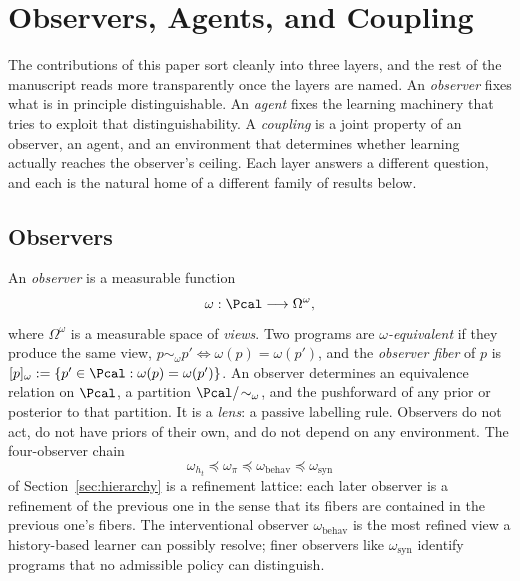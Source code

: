 %

\section{Observers, Agents, and Coupling}
\label{sec:ontology}

The contributions of this paper sort cleanly into three layers, and the rest of the manuscript reads more transparently once the layers are named. An \emph{observer} fixes what is in principle distinguishable. An \emph{agent} fixes the learning machinery that tries to exploit that distinguishability. A \emph{coupling} is a joint property of an observer, an agent, and an environment that determines whether learning actually reaches the observer's ceiling. Each layer answers a different question, and each is the natural home of a different family of results below.

\subsection{Observers}
\label{sec:ontology-observers}

An \emph{observer} is a measurable function
\[
\omega:\Pcal\longrightarrow\Omega^\omega,
\]
where $\Omega^\omega$ is a measurable space of \emph{views}. Two programs are \emph{$\omega$-equivalent} if they produce the same view, $p\sim_\omega p'\iff\omega(p)=\omega(p')$, and the \emph{observer fiber} of $p$ is $[p]_\omega:=\{p'\in\Pcal:\omega(p)=\omega(p')\}$. An observer determines an equivalence relation on $\Pcal$, a partition $\Pcal/\!\sim_\omega$, and the pushforward of any prior or posterior to that partition. It is a \emph{lens}: a passive labelling rule. Observers do not act, do not have priors of their own, and do not depend on any environment. The four-observer chain
\[
\omega_{h_t}\preceq\omega_\pi\preceq\omega_{\mathrm{behav}}\preceq\omega_{\mathrm{syn}}
\]
of Section~\ref{sec:hierarchy} is a refinement lattice: each later observer is a refinement of the previous one in the sense that its fibers are contained in the previous one's fibers. The interventional observer $\omega_{\mathrm{behav}}$ is the most refined view a history-based learner can possibly resolve; finer observers like $\omega_{\mathrm{syn}}$ identify programs that no admissible policy can distinguish.

